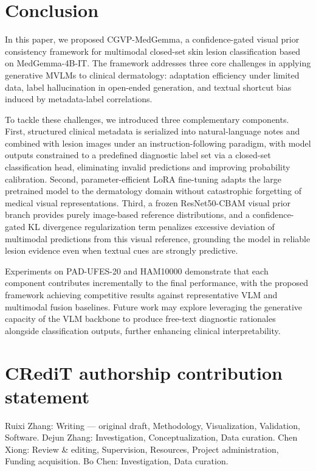 \documentclass[preprint,12pt]{elsarticle}
\makeatletter
\def@NAT@last@yr{--\NAT@penalty}%
\makeatother
\begin{document}
\section{Conclusion}

In this paper, we proposed CGVP-MedGemma, a confidence-gated visual prior consistency framework for multimodal closed-set skin lesion classification based on MedGemma-4B-IT. The framework addresses three core challenges in applying generative MVLMs to clinical dermatology: adaptation efficiency under limited data, label hallucination in open-ended generation, and textual shortcut bias induced by metadata-label correlations.

To tackle these challenges, we introduced three complementary components. First, structured clinical metadata is serialized into natural-language notes and combined with lesion images under an instruction-following paradigm, with model outputs constrained to a predefined diagnostic label set via a closed-set classification head, eliminating invalid predictions and improving probability calibration. Second, parameter-efficient LoRA fine-tuning adapts the large pretrained model to the dermatology domain without catastrophic forgetting of medical visual representations. Third, a frozen ResNet50-CBAM visual prior branch provides purely image-based reference distributions, and a confidence-gated KL divergence regularization term penalizes excessive deviation of multimodal predictions from this visual reference, grounding the model in reliable lesion evidence even when textual cues are strongly predictive.


Experiments on PAD-UFES-20 and HAM10000 demonstrate that each component contributes incrementally to the final performance, with the proposed framework achieving competitive results against representative VLM and multimodal fusion baselines. Future work may explore leveraging the generative capacity of the VLM backbone to produce free-text diagnostic rationales alongside classification outputs, further enhancing clinical interpretability.

\section*{CRediT authorship contribution statement}
Ruixi Zhang: Writing --- original draft, Methodology, Visualization, Validation, Software. Dejun Zhang: Investigation, Conceptualization, Data curation. Chen Xiong: Review \& editing, Supervision, Resources, Project administration, Funding acquisition. Bo Chen: Investigation, Data curation.
\end{document}
